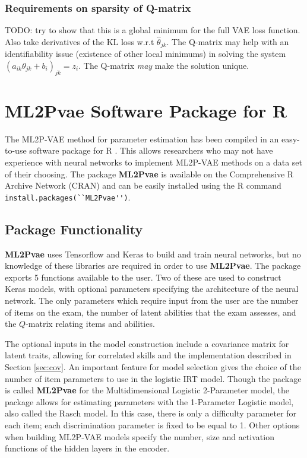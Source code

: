 \subsubsection{Requirements on sparsity of Q-matrix}

TODO: try to show that this is a global minimum for the full VAE loss function. Also take derivatives of the KL loss w.r.t $\hat \theta_{jk}$. The Q-matrix may help with an identifiability issue (existence of other local minimums) in solving the system $(a_{ik}\theta_{jk} + b_i)_{jk} = z_i$. The Q-matrix \textit{may} make the solution unique.



\section{\textbf{ML2Pvae} Software Package for R}
The ML2P-VAE method for parameter estimation has been compiled in an easy-to-use software package for R \cite{r_package}. This allows researchers who may not have experience with neural networks to implement ML2P-VAE methods on a data set of their choosing. The package \textbf{ML2Pvae} is available on the Comprehensive R Archive Network (CRAN) and can be easily installed using the R command \verb!install.packages(``ML2Pvae'')!. 

\subsection{Package Functionality}
\textbf{ML2Pvae} uses Tensorflow and Keras to build and train neural networks, but no knowledge of these libraries are required in order to use \textbf{ML2Pvae}. The package exports 5 functions available to the user. Two of these are used to construct Keras models, with optional parameters specifying the architecture of the neural network. The only parameters which require input from the user are the number of items on the exam, the number of latent abilities that the exam assesses, and the $Q$-matrix relating items and abilities.

The optional inputs in the model construction include a covariance matrix for latent traits, allowing for correlated skills and the implementation described in Section \ref{sec:cov}. An important feature for model selection gives the choice of the number of item parameters to use in the logistic IRT model. Though the package is called \textbf{ML2Pvae} for the Multidimensional Logistic 2-Parameter model, the package allows for estimating parameters with the 1-Parameter Logistic model, also called the Rasch model. In this case, there is only a difficulty parameter for each item; each  discrimination parameter is fixed to be equal to 1. Other options when building ML2P-VAE models specify the number, size and activation functions of the hidden layers in the encoder.

